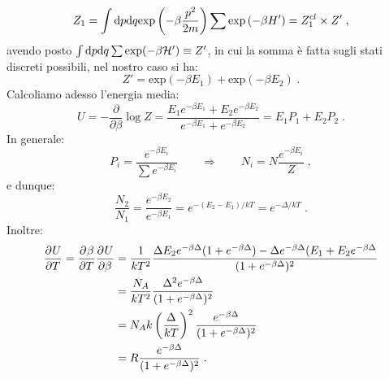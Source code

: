 \begin{exm}
\begin{equation}
Z_1=\int \diff[p]\diff[q] \mathrm{exp}\left(-\beta\frac{p^2}{2m}\right)\sum \mathrm{exp}\left(-\beta H'\right)=Z_1^{cl}\times Z'\;,
\end{equation}
avendo posto $\int \diff[p]\diff[q] \sum \mathrm{exp}(-\beta\ham')\equiv Z'$, in cui la somma è fatta sugli stati discreti possibili, nel nostro caso si ha:
\begin{equation}
Z'=\mathrm{exp}(-\beta E_1)+\mathrm{exp}(-\beta E_2)\;.
\end{equation}
Calcoliamo adesso l'energia media:
\begin{equation}
U= -\frac{\partial}{\partial\beta} \log Z=\frac{E_1e^{-\beta E_1}+E_2e^{-\beta E_2}}{e^{-\beta E_1}+e^{-\beta E_2}}=E_1P_1+E_2P_2\;.
\end{equation}
In generale:
\begin{equation*}
P_i=\frac{e^{-\beta E_i}}{\sum e^{-\beta E_i}}\qquad  \Longrightarrow\qquad  N_i=N\frac{e^{-\beta E_i}}{Z}\;,
\end{equation*}
e dunque:
\begin{equation}
\frac{N_2}{N_1}=\frac{e^{-\beta E_2}}{e^{-\beta E_1}}=e^{-(E_2-E_1)/kT}=e^{-\Delta/kT}\;.
\end{equation}
Inoltre:
\begin{align*}
\pdev{U}{T}=\pdev{\beta}{T}\pdev{U}{\beta}&= \frac{1}{kT^2}\frac{\Delta E_2e^{-\beta\Delta}(1+e^{-\beta\Delta})-\Delta e^{-\beta\Delta}(E_1+E_2e^{-\beta\Delta}}{(1+e^{-\beta\Delta})^2} \\
&= \frac{N_A}{kT^2}\frac{\Delta^2 e^{-\beta\Delta}}{(1+e^{-\beta\Delta})^2} \\
&= N_Ak \left(\frac{\Delta}{kT}\right)^2 \frac{e^{-\beta\Delta}}{(1+e^{-\beta\Delta})^2} \\
&= R \frac{e^{-\beta\Delta}}{(1+e^{-\beta\Delta})^2}\;.
\end{align*}
\end{exm}